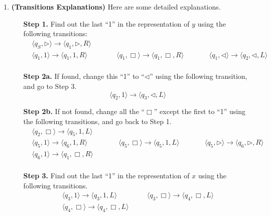 \documentclass[12pt,a4paper]{article}
\makeatletter
\newtheorem*{solution}{Solution}
\theoremstyle{definition}
\renewenvironment{solution}[1][Solution] {\par\pushQED{\qed}\normalfont\topsep6\p@\@plus6\p@\relax\trivlist\item[\hskip\labelsep\bfseries#1\@addpunct{.}]\ignorespaces}{\popQED\endtrivlist\@endpefalse} \makeatother
\makeatother
\begin{document}
\begin{enumerate}
\begin{solution}
\begin{enumerate}
\textbf{(Transitions Explanations)} Here are some detailed explanations.
\begin{itemize}
\item[\textbf{Step 1.} ] Find out the last ``1'' in the representation of $y$ using the following transitions:
\begin{displaymath}
\begin{aligned}
& \langle q_S, \triangleright \rangle \rightarrow \langle q_1, \triangleright, R\rangle & \\
& \langle q_1, 1 \rangle \rightarrow \langle q_1, 1, R\rangle & \qquad
& \langle q_1, \Box \rangle \rightarrow \langle q_1, \Box, R\rangle & \qquad
& \langle q_1, \triangleleft \rangle \rightarrow \langle q_2, \triangleleft, L\rangle & \\
\end{aligned}
\end{displaymath}

\item[\textbf{Step 2a.} ] If found, change this ``1'' to ``$\triangleleft$'' using the following transition, and go to Step 3.
\begin{displaymath}
\langle q_2, 1 \rangle \rightarrow \langle q_3, \triangleleft, L\rangle
\end{displaymath}

\item[\textbf{Step 2b.} ] If not found, change all the ``$\Box$'' except the first to ``1'' using the following transitions, and go back to Step 1.
\begin{displaymath}
\begin{aligned}
& \langle q_2, \Box \rangle \rightarrow \langle q_5, 1, L\rangle & \\
& \langle q_5, 1 \rangle \rightarrow \langle q_6, 1, R\rangle & \qquad
& \langle q_5, \Box \rangle \rightarrow \langle q_5, 1, L\rangle & \qquad
& \langle q_5, \triangleright \rangle \rightarrow \langle q_6, \triangleright, R\rangle & \\
& \langle q_6, 1 \rangle \rightarrow \langle q_1, \Box, R\rangle & \\
\end{aligned}
\end{displaymath}

\item[\textbf{Step 3.} ] Find out the last ``1'' in the representation of $x$ using the following transitions.
\begin{displaymath}
\begin{aligned}
& \langle q_3, 1 \rangle \rightarrow \langle q_3, 1, L\rangle & \quad
& \langle q_3, \Box \rangle \rightarrow \langle q_4, \Box, L\rangle & \\
& \langle q_4, \Box \rangle \rightarrow \langle q_4, \Box, L\rangle &
\end{aligned}
\end{displaymath}


\end{itemize}
\end{enumerate}
\end{solution}
\end{enumerate}
\end{document}
